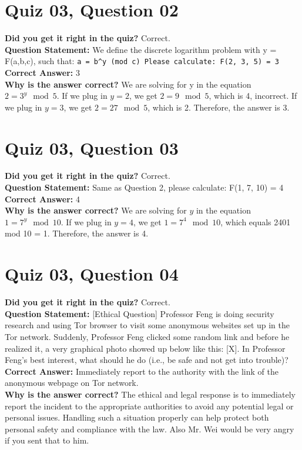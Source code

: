 \documentclass{article}
\begin{document}
\vspace{1em}

\section*{Quiz 03, Question 02}
\textbf{Did you get it right in the quiz?} Correct. \\
\textbf{Question Statement:} We define the discrete logarithm problem with y = F(a,b,c), such that: 
\verb|a = b^y (mod c) Please calculate: F(2, 3, 5) = 3 | \\
\textbf{Correct Answer:} 3 \\
\textbf{Why is the answer correct?} We are solving for y in the equation \( 2 = 3^y \mod 5 \). If we plug in \( y = 2 \), we get \( 2 = 9 \mod 5 \), which is 4, incorrect. If we plug in \( y = 3 \), we get \( 2 = 27 \mod 5 \), which is 2. Therefore, the answer is 3.
\vspace{1em}

\section*{Quiz 03, Question 03}
\textbf{Did you get it right in the quiz?} Correct. \\
\textbf{Question Statement:} Same as Question 2, please calculate: F(1, 7, 10) = 4 \\
\textbf{Correct Answer:} 4 \\
\textbf{Why is the answer correct?} We are solving for \( y \) in the equation \( 1 = 7^y \mod 10 \). If we plug in \( y = 4 \), we get \( 1 = 7^4 \mod 10 \), which equals 2401 mod 10 = 1. Therefore, the answer is 4.
\vspace{1em}

\section*{Quiz 03, Question 04}
\textbf{Did you get it right in the quiz?} Correct. \\
\textbf{Question Statement:} [Ethical Question] Professor Feng is doing security research and using Tor browser to visit some anonymous websites set up in the Tor network. Suddenly, Professor Feng clicked some random link and before he realized it, a very graphical photo showed up below like this: [X]. In Professor Feng's best interest, what should he do (i.e., be safe and not get into trouble)? \\
\textbf{Correct Answer:} Immediately report to the authority with the link of the anonymous webpage on Tor network. \\
\textbf{Why is the answer correct?} The ethical and legal response is to immediately report the incident to the appropriate authorities to avoid any potential legal or personal issues. Handling such a situation properly can help protect both personal safety and compliance with the law. Also Mr. Wei would be very angry if you sent that to him.
\end{document}
